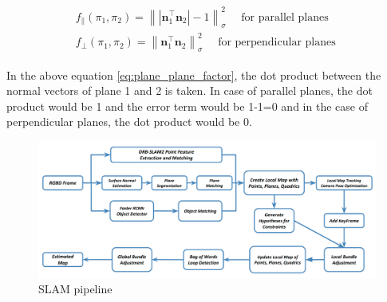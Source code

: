\documentclass[report.tex]{subfiles}
\begin{document}
\begin{itemize}
\begin{equation}
{
\begin{aligned}
\begin{gathered}
f_{\|}\left(\pi_{1}, \pi_{2}\right)=\left\|\left|\mathbf{n}_{1}^{\top} \mathbf{n}_{2}\right|-1\right\|_{\sigma}^{2} \quad \text { for parallel planes } \\
f_{\perp}\left(\pi_{1}, \pi_{2}\right)=\left\|\mathbf{n}_{1}^{\top} \mathbf{n}_{2}\right\|_{\sigma}^{2} \quad \text { for perpendicular planes }
\end{gathered}
\end{aligned}
} \label{eq:plane_plane_factor}
\end{equation}

In the above equation \ref{eq:plane_plane_factor}, the dot product between the normal vectors of plane 1 and 2 is taken. In case of parallel planes, the dot product would be 1 and the error term would be 1-1=0 and in the case of perpendicular planes, the dot product would be 0.

\begin{figure}[H]
\centering
\includegraphics[width=\textwidth] {Images/slam_pipeline.png}
\caption{\centering SLAM pipeline \cite{StructureAS}}
\label{fig:slam_pipeline.png}
\end{figure}


\end{itemize}
\end{document}
